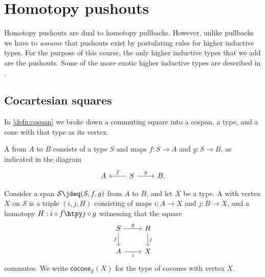 \chapter{Homotopy pushouts}

Homotopy pushouts are dual to homotopy pullbacks. However, unlike pullbacks we have to \emph{assume} that pushouts exist by postulating rules for higher inductive types. For the purpose of this course, the only higher inductive types that we add are the pushouts. Some of the more exotic higher inductive types are described in \cite{hottbook}.

\section{Cocartesian squares}

In \cref{defn:cospan} we broke down a commuting square into a cospan, a type, and a cone with that type as its vertex. 
\begin{defn}
A  from $A$ to $B$ consists of a type $S$ and maps $f:S\to A$ and $g:S\to B$, as indicated in the diagram
\begin{equation*}
\begin{tikzcd}
A & S \arrow[l,swap,"f"] \arrow[r,"g"] & B.
\end{tikzcd}
\end{equation*}
\end{defn}

\begin{defn}
Consider a span $\mathcal{S}\jdeq (S,f,g)$ from $A$ to $B$, and let $X$ be a type.
A  with vertex $X$ on $\mathcal{S}$ is a triple $(i,j,H)$ consisting of maps $i:A\to X$ and $j:B\to X$, and a homotopy $H:i\circ f\htpy j\circ g$ witnessing that the square
\begin{equation*}
\begin{tikzcd}
S \arrow[r,"g"] \arrow[d,swap,"f"] & B \arrow[d,"j"] \\
A \arrow[r,swap,"i"] & X
\end{tikzcd}
\end{equation*}
commutes.
We write $\mathsf{cocone}_{\mathcal{S}}(X)$ for the type of cocones with vertex $X$.
\end{defn}

